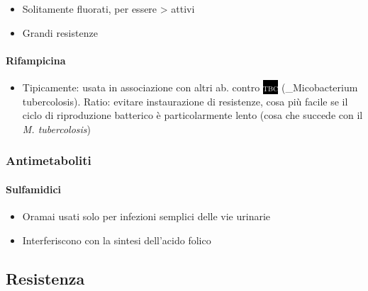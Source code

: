 \documentclass[italian,]{article}
\providecommand{\tightlist}{%
  \setlength{\itemsep}{0pt}\setlength{\parskip}{0pt}}
\newcommand{\pat}[1]{\colorbox{black}{\textcolor{white}{\textsc{#1}}}}
\begin{document}
\begin{itemize}
\tightlist
\item
  Solitamente fluorati, per essere \textgreater{} attivi
\item
  Grandi resistenze
\end{itemize}

\hypertarget{rifampicina}{%
\paragraph{Rifampicina}\label{rifampicina}}

\begin{itemize}
\tightlist
\item
  Tipicamente: usata in associazione con altri ab. contro \pat{tbc}
  (\_Micobacterium tubercolosis). Ratio: evitare instaurazione di
  resistenze, cosa più facile se il ciclo di riproduzione batterico è
  particolarmente lento (cosa che succede con il \emph{M. tubercolosis})
\end{itemize}

\hypertarget{antimetaboliti}{%
\subsubsection{Antimetaboliti}\label{antimetaboliti}}

\hypertarget{sulfamidici}{%
\paragraph{Sulfamidici}\label{sulfamidici}}

\begin{itemize}
\tightlist
\item
  Oramai usati solo per infezioni semplici delle vie urinarie
\item
  Interferiscono con la sintesi dell'acido folico
\end{itemize}

\hypertarget{resistenza}{%
\subsection{Resistenza}\label{resistenza}}
\end{document}
